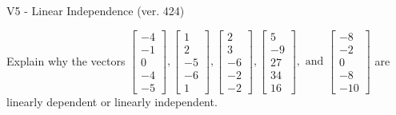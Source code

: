 \begin{exercise}
  \begin{exerciseTitle}V5 - Linear Independence (ver. 424)\end{exerciseTitle}
  \begin{exerciseStatement}
    Explain why the vectors \(\left[\begin{array}{r}
-4 \\
-1 \\
0 \\
-4 \\
-5
\end{array}\right] , \left[\begin{array}{r}
1 \\
2 \\
-5 \\
-6 \\
1
\end{array}\right] , \left[\begin{array}{r}
2 \\
3 \\
-6 \\
-2 \\
-2
\end{array}\right] , \left[\begin{array}{r}
5 \\
-9 \\
27 \\
34 \\
16
\end{array}\right] , \text{ and } \left[\begin{array}{r}
-8 \\
-2 \\
0 \\
-8 \\
-10
\end{array}\right]\) are linearly dependent or linearly independent.	



\end{exerciseStatement}
\end{exercise}
